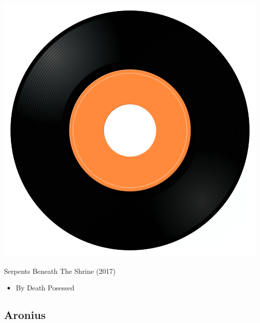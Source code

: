 \begin{minipage}[t]{0.25\textwidth}\vspace{0pt}
\captionsetup{type=figure}
\includegraphics[width=\textwidth]{Images/cover.png}
\caption*{Serpents Beneath The Shrine (2017)}
\end{minipage}
\begin{minipage}[t]{0.25\textwidth}\vspace{0pt}
\begin{itemize}[nosep,leftmargin=1em,labelwidth=*,align=left]
	\setlength{\itemsep}{0pt}
	\item By Death Posessed
\end{itemize}
\end{minipage}

\subsection{Aronius}

